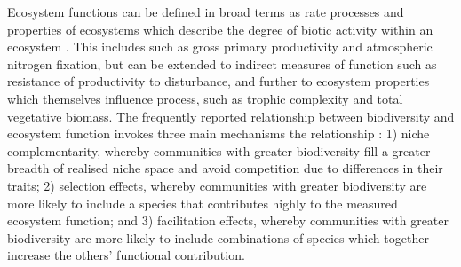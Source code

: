 \documentclass[11pt,a4paper]{article}
\begin{document}
Ecosystem functions can be defined in broad terms as rate processes and properties of ecosystems which describe the degree of biotic activity within an ecosystem \citep{Jax2005}. This includes  such as gross primary productivity and atmospheric nitrogen fixation, but can be extended to indirect measures of function such as resistance of productivity to disturbance, and further to ecosystem properties which themselves influence process, such as trophic complexity and total vegetative biomass. The frequently reported  relationship between biodiversity and ecosystem function invokes three main mechanisms  the relationship \citep{Tilman2014}: 1) niche complementarity, whereby communities with greater biodiversity fill a greater breadth of realised niche space and avoid competition due to differences in their traits; 2) selection effects, whereby communities with greater biodiversity are more likely to include a species that contributes highly to the measured ecosystem function; and 3) facilitation effects, whereby communities with greater biodiversity are more likely to include combinations of species which together increase the others' functional contribution.
\end{document}
